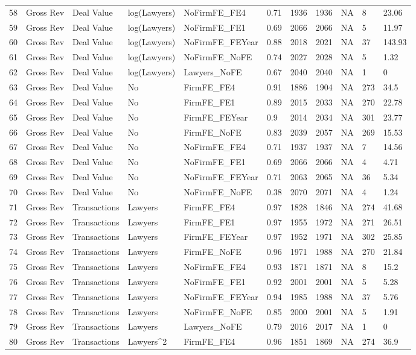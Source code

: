 \documentclass{article}
\begin{document}
\begin{table}[H]
\begin{tabular}{rllllllllll}
  58 & Gross Rev & Deal Value & log(Lawyers) & NoFirmFE\_FE4 & 0.71 & 1936 & 1936 & NA & 8 & 23.06 \\ 
  59 & Gross Rev & Deal Value & log(Lawyers) & NoFirmFE\_FE1 & 0.69 & 2066 & 2066 & NA & 5 & 11.97 \\ 
  60 & Gross Rev & Deal Value & log(Lawyers) & NoFirmFE\_FEYear & 0.88 & 2018 & 2021 & NA & 37 & 143.93 \\ 
  61 & Gross Rev & Deal Value & log(Lawyers) & NoFirmFE\_NoFE & 0.74 & 2027 & 2028 & NA & 5 & 1.32 \\ 
  62 & Gross Rev & Deal Value & log(Lawyers) & Lawyers\_NoFE & 0.67 & 2040 & 2040 & NA & 1 & 0 \\ 
  63 & Gross Rev & Deal Value & No & FirmFE\_FE4 & 0.91 & 1886 & 1904 & NA & 273 & 34.5 \\ 
  64 & Gross Rev & Deal Value & No & FirmFE\_FE1 & 0.89 & 2015 & 2033 & NA & 270 & 22.78 \\ 
  65 & Gross Rev & Deal Value & No & FirmFE\_FEYear & 0.9 & 2014 & 2034 & NA & 301 & 23.77 \\ 
  66 & Gross Rev & Deal Value & No & FirmFE\_NoFE & 0.83 & 2039 & 2057 & NA & 269 & 15.53 \\ 
  67 & Gross Rev & Deal Value & No & NoFirmFE\_FE4 & 0.71 & 1937 & 1937 & NA & 7 & 14.56 \\ 
  68 & Gross Rev & Deal Value & No & NoFirmFE\_FE1 & 0.69 & 2066 & 2066 & NA & 4 & 4.71 \\ 
  69 & Gross Rev & Deal Value & No & NoFirmFE\_FEYear & 0.71 & 2063 & 2065 & NA & 36 & 5.34 \\ 
  70 & Gross Rev & Deal Value & No & NoFirmFE\_NoFE & 0.38 & 2070 & 2071 & NA & 4 & 1.24 \\ 
  71 & Gross Rev & Transactions & Lawyers & FirmFE\_FE4 & 0.97 & 1828 & 1846 & NA & 274 & 41.68 \\ 
  72 & Gross Rev & Transactions & Lawyers & FirmFE\_FE1 & 0.97 & 1955 & 1972 & NA & 271 & 26.51 \\ 
  73 & Gross Rev & Transactions & Lawyers & FirmFE\_FEYear & 0.97 & 1952 & 1971 & NA & 302 & 25.85 \\ 
  74 & Gross Rev & Transactions & Lawyers & FirmFE\_NoFE & 0.96 & 1971 & 1988 & NA & 270 & 21.84 \\ 
  75 & Gross Rev & Transactions & Lawyers & NoFirmFE\_FE4 & 0.93 & 1871 & 1871 & NA & 8 & 15.2 \\ 
  76 & Gross Rev & Transactions & Lawyers & NoFirmFE\_FE1 & 0.92 & 2001 & 2001 & NA & 5 & 5.28 \\ 
  77 & Gross Rev & Transactions & Lawyers & NoFirmFE\_FEYear & 0.94 & 1985 & 1988 & NA & 37 & 5.76 \\ 
  78 & Gross Rev & Transactions & Lawyers & NoFirmFE\_NoFE & 0.85 & 2000 & 2001 & NA & 5 & 1.91 \\ 
  79 & Gross Rev & Transactions & Lawyers & Lawyers\_NoFE & 0.79 & 2016 & 2017 & NA & 1 & 0 \\ 
  80 & Gross Rev & Transactions & Lawyers^2 & FirmFE\_FE4 & 0.96 & 1851 & 1869 & NA & 274 & 36.9 \\ 
   \hline
\end{tabular}
\end{table}
\end{document}
